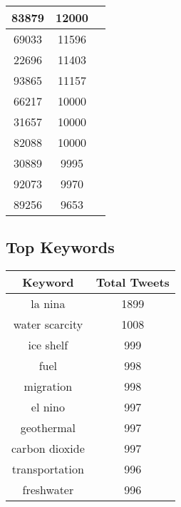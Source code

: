 \documentclass{article}\usepackage[T1]{fontenc}
\begin{document}
\begin{tabular}{|c|c|c|}
 \hline
83879 & 12000\\ 
 \hline
69033 & 11596\\ 
 \hline
22696 & 11403\\ 
 \hline
93865 & 11157\\ 
 \hline
66217 & 10000\\ 
 \hline
31657 & 10000\\ 
 \hline
82088 & 10000\\ 
 \hline
30889 & 9995\\ 
 \hline
92073 & 9970\\ 
 \hline
89256 & 9653\\ 
 \hline
\end{tabular}\subsection*{Top Keywords}\begin{tabular}{|c|c|}         \hline         Keyword & Total Tweets \\ 
 \hline
la nina & 1899\\ 
 \hline
water scarcity & 1008\\ 
 \hline
ice shelf & 999\\ 
 \hline
fuel & 998\\ 
 \hline
migration & 998\\ 
 \hline
el nino & 997\\ 
 \hline
geothermal & 997\\ 
 \hline
carbon dioxide & 997\\ 
 \hline
transportation & 996\\ 
 \hline
freshwater & 996\\ 
 \hline
\end{tabular}
\end{document}
